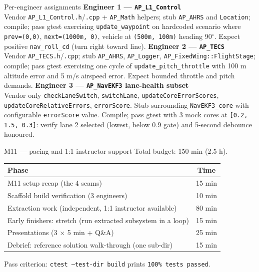 \documentclass[aspectratio=169,11pt]{beamer}
\begin{document}
\begin{frame}{Per-engineer assignments}
  \textbf{Engineer 1 --- \texttt{AP\_L1\_Control}}\\
  Vendor \texttt{AP\_L1\_Control.h}/\texttt{.cpp} + \texttt{AP\_Math} helpers; stub \texttt{AP\_AHRS} and \texttt{Location}; compile; pass gtest exercising \texttt{update\_waypoint} on hardcoded scenario where \texttt{prev=(0,0)}, \texttt{next=(1000m, 0)}, vehicle at \texttt{(500m, 100m)} heading 90$^\circ$. Expect positive \texttt{nav\_roll\_cd} (turn right toward line).
  \vfill
  \textbf{Engineer 2 --- \texttt{AP\_TECS}}\\
  Vendor \texttt{AP\_TECS.h}/\texttt{.cpp}; stub \texttt{AP\_AHRS}, \texttt{AP\_Logger}, \texttt{AP\_FixedWing::FlightStage}; compile; pass gtest exercising one cycle of \texttt{update\_pitch\_throttle} with 100 m altitude error and 5 m/s airspeed error. Expect bounded throttle and pitch demands.
  \vfill
  \textbf{Engineer 3 --- \texttt{AP\_NavEKF3} lane-health subset}\\
  Vendor only \texttt{checkLaneSwitch}, \texttt{switchLane}, \texttt{updateCoreErrorScores}, \texttt{updateCoreRelativeErrors}, \texttt{errorScore}. Stub surrounding \texttt{NavEKF3\_core} with configurable \texttt{errorScore} value. Compile; pass gtest with 3 mock cores at \texttt{[0.2, 1.5, 0.3]}: verify lane 2 selected (lowest, below 0.9 gate) and 5-second debounce honoured.
\end{frame}

\begin{frame}[allowframebreaks]{M11 --- pacing and 1:1 instructor support}
  Total budget: 150 min (2.5 h).
  \vfill
  \begin{center}\small
  \begin{tabular}{|l|c|}\hline
  Phase & Time \\ \hline
  M11 setup recap (the 4 seams) & 15 min \\ \hline
  Scaffold build verification (3 engineers) & 10 min \\ \hline
  Extraction work (independent, 1:1 instructor available) & 80 min \\ \hline
  Early finishers: stretch (run extracted subsystem in a loop) & 15 min \\ \hline
  Presentations (3 $\times$ 5 min + Q\&A) & 25 min \\ \hline
  Debrief: reference solution walk-through (one sub-dir) & 15 min \\ \hline
  \end{tabular}
  \end{center}
  \vfill
  Pass criterion: \texttt{ctest --test-dir build} prints \texttt{100\% tests passed}.
\end{frame}
\end{document}
